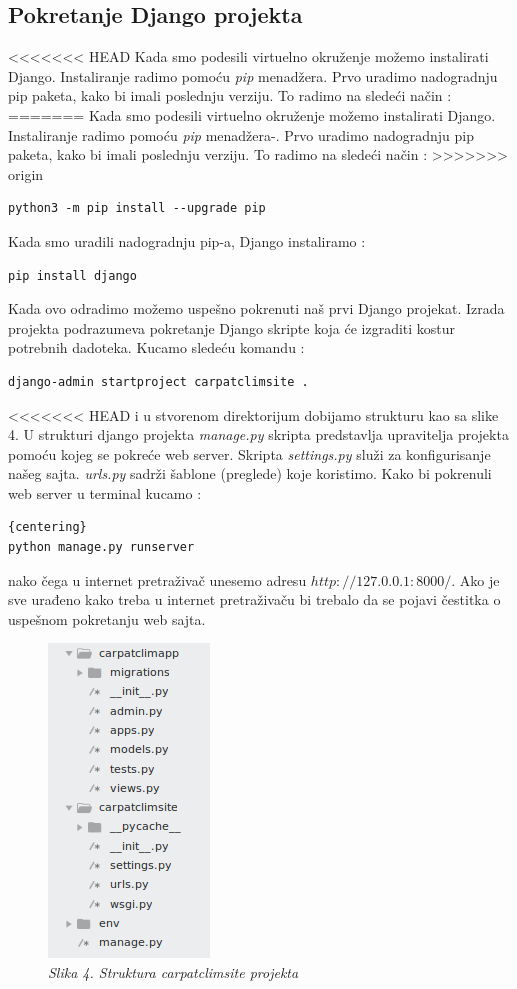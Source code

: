 \documentclass[12pt]{article}
\begin{document}
\subsection{Pokretanje Django projekta}
<<<<<<< HEAD
Kada smo podesili virtuelno okruženje možemo instalirati Django.  Instaliranje radimo pomoću \textsl{pip} menadžera. Prvo uradimo nadogradnju pip paketa, kako bi imali poslednju verziju. To radimo na sledeći način :
=======
Kada smo podesili virtuelno okruženje možemo instalirati Django.  Instaliranje radimo pomoću  \textsl{pip} menadžera-. Prvo uradimo nadogradnju pip paketa, kako bi imali poslednju verziju. To radimo na sledeći način :
>>>>>>> origin
\begin{lstlisting}
python3 -m pip install --upgrade pip
\end{lstlisting} 
Kada smo uradili nadogradnju pip-a, Django instaliramo :
\begin{lstlisting}
pip install django
\end{lstlisting}
Kada ovo odradimo možemo uspešno pokrenuti naš prvi Django projekat. Izrada projekta podrazumeva pokretanje Django skripte koja će izgraditi kostur potrebnih dadoteka. Kucamo sledeću komandu :
\begin{lstlisting}
django-admin startproject carpatclimsite .
\end{lstlisting} 
<<<<<<< HEAD
i u stvorenom direktorijum dobijamo strukturu kao sa slike 4. U strukturi django projekta \textsl{manage.py} skripta predstavlja upravitelja projekta pomoću kojeg se pokreće web server. Skripta        \textsl{settings.py} služi za konfigurisanje našeg sajta. \textsl{urls.py} sadrži šablone (preglede) koje koristimo. Kako bi pokrenuli web server u terminal kucamo : 
\begin{lstlisting}{centering}
python manage.py runserver
\end{lstlisting}nako čega u internet pretraživač unesemo adresu $http://127.0.0.1:8000/$.  Ako je sve urađeno kako treba u internet pretraživaču bi trebalo da se pojavi čestitka o uspešnom pokretanju web sajta.
\begin{figure}[h!]
	\centering
	\includegraphics[width=0.33\linewidth]{Kosturapp.png}
	\caption*{\textsl{Slika 4. Struktura carpatclimsite projekta}}
\end{figure}
\end{document}
